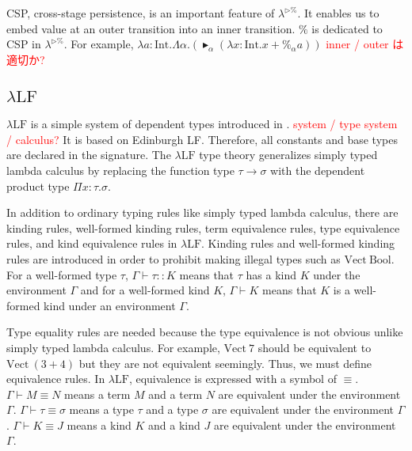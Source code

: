 \documentclass[runningheads]{llncs}
\newcommand{\red}[1]{\textcolor{red}{#1 }}
\newcommand{\LTP}{$\lambda^{\triangleright\%}$\xspace}
\newcommand{\LLF}{$\lambda\textrm{LF}$\xspace}
\newcommand{\G}{\Gamma}
\newcommand{\TB}{\blacktriangleright}
\newcommand{\E}{\equiv}
\newcommand{\I}{\textrm{Int}}
\begin{document}

CSP, cross-stage persistence, is an important feature of \LTP.
It enables us to embed value at an outer transition into an inner transition.
$\%$ is dedicated to CSP in \LTP.
For example, $\lambda a:\I.\Lambda\alpha.(\TB_\alpha (\lambda x:\I.x+\%_\alpha a))$
\red{inner / outer は適切か?}



\subsection{\LLF}

\LLF is a simple system of dependent types introduced in \cite{attapl}.
\red{system / type system / calculus?}
It is based on Edinburgh LF\cite{harper1993framework}.
Therefore, all constants and base types are declared in the signature.
The \LLF type theory generalizes simply typed lambda calculus
by replacing the function type $\tau\to\sigma$ with the dependent product type $\Pi x:\tau.\sigma$.

In addition to ordinary typing rules like simply typed lambda calculus,
there are kinding rules, well-formed kinding rules, term equivalence rules, type equivalence rules, and kind equivalence rules in \LLF.
Kinding rules and well-formed kinding rules are 
introduced in order to prohibit making illegal types such as $\textrm{Vect}\ \textrm{Bool}$.
For a well-formed type $\tau$, $\G \vdash \tau :: K$ means that $\tau$ has a kind $K$ under the environment $\G$ and 
for a well-formed kind $K$, $\G \vdash K$ means that $K$ is a well-formed kind under an environment $\G$.

Type equality rules are needed because the type equivalence is not obvious unlike simply typed lambda calculus.
For example, $\textrm{Vect}\ 7$ should be equivalent to $\textrm{Vect}\ (3+4)$
but they are not equivalent seemingly. Thus, we must define equivalence rules.
In \LLF, equivalence is expressed with a symbol of $\E$.
$\G \vdash M \E N$ means a term $M$ and a term $N$ are equivalent under the environment $\G$.
$\G \vdash \tau \E \sigma$ means a type $\tau$ and a type $\sigma$ are equivalent under the environment $\G$.
$\G \vdash K \E J$ means a kind $K$ and a kind $J$ are equivalent under the environment $\G$.
\end{document}
